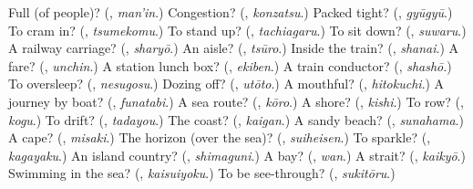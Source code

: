 \begin{tcolorbox}[breakable,colback=teal!4,colframe=teal!35!black,title={Before you move on}]
Full (of people)? (\textbf{}, \emph{man'in}.) Congestion? (\textbf{}, \emph{konzatsu}.) Packed tight? (\textbf{}, \emph{gyūgyū}.) To cram in? (\textbf{}, \emph{tsumekomu}.) To stand up? (\textbf{}, \emph{tachiagaru}.) To sit down? (\textbf{}, \emph{suwaru}.) A railway carriage? (\textbf{}, \emph{sharyō}.) An aisle? (\textbf{}, \emph{tsūro}.) Inside the train? (\textbf{}, \emph{shanai}.) A fare? (\textbf{}, \emph{unchin}.) A station lunch box? (\textbf{}, \emph{ekiben}.) A train conductor? (\textbf{}, \emph{shashō}.) To oversleep? (\textbf{}, \emph{nesugosu}.) Dozing off? (\textbf{}, \emph{utōto}.) A mouthful? (\textbf{}, \emph{hitokuchi}.) A journey by boat? (\textbf{}, \emph{funatabi}.) A sea route? (\textbf{}, \emph{kōro}.) A shore? (\textbf{}, \emph{kishi}.) To row? (\textbf{}, \emph{kogu}.) To drift? (\textbf{}, \emph{tadayou}.) The coast? (\textbf{}, \emph{kaigan}.) A sandy beach? (\textbf{}, \emph{sunahama}.) A cape? (\textbf{}, \emph{misaki}.) The horizon (over the sea)? (\textbf{}, \emph{suiheisen}.) To sparkle? (\textbf{}, \emph{kagayaku}.) An island country? (\textbf{}, \emph{shimaguni}.) A bay? (\textbf{}, \emph{wan}.) A strait? (\textbf{}, \emph{kaikyō}.) Swimming in the sea? (\textbf{}, \emph{kaisuiyoku}.) To be see-through? (\textbf{}, \emph{sukitōru}.)
\end{tcolorbox}
